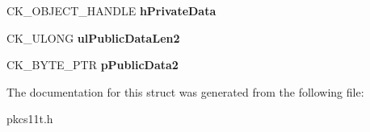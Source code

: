 \begin{DoxyCompactItemize}
\item 
\mbox{\label{struct_c_k___e_c_d_h2___d_e_r_i_v_e___p_a_r_a_m_s_a4fe0a769ab8dbec4bd9f3400bff1b181}} 
C\+K\+\_\+\+O\+B\+J\+E\+C\+T\+\_\+\+H\+A\+N\+D\+LE {\bfseries h\+Private\+Data}
\item 
\mbox{\label{struct_c_k___e_c_d_h2___d_e_r_i_v_e___p_a_r_a_m_s_a6bf8841549189850b62cdb4c81ae6bcb}} 
C\+K\+\_\+\+U\+L\+O\+NG {\bfseries ul\+Public\+Data\+Len2}
\item 
\mbox{\label{struct_c_k___e_c_d_h2___d_e_r_i_v_e___p_a_r_a_m_s_a61ca952359c19f29e7bb868bc136acd3}} 
C\+K\+\_\+\+B\+Y\+T\+E\+\_\+\+P\+TR {\bfseries p\+Public\+Data2}
\end{DoxyCompactItemize}


The documentation for this struct was generated from the following file\+:\begin{DoxyCompactItemize}
\item 
pkcs11t.\+h\end{DoxyCompactItemize}
